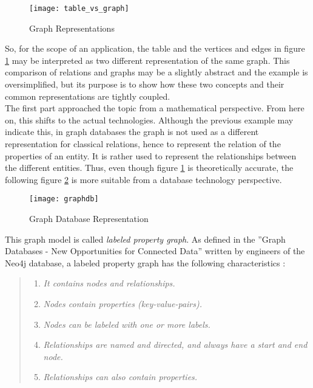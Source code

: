 \begin{figure}[H]
	\centering
	\texttt{[image: table\_vs\_graph]}
	\caption[Graph Representations]{Graph Representations }
	\label{fig:GraphTheoryExample}
\end{figure}

So, for the scope of an application, the table and the vertices and edges in figure \ref{fig:GraphTheoryExample} may be interpreted as two different representation of the same graph. This comparison of relations and graphs may be a slightly abstract and the example is oversimplified, but its purpose is to show how these two concepts and their common representations are tightly coupled.\\

The first part approached the topic from a mathematical perspective. From here on, this shifts to the actual technologies. Although the previous example may indicate this, in graph databases the graph is not used as a different representation for classical relations, hence to represent the relation of the properties of an entity. It is rather used to represent the relationships between the different entities. Thus, even though figure \ref{fig:GraphTheoryExample} is theoretically accurate, the following figure \ref{fig:GraphDBExample} is more suitable from a database technology perspective.

\begin{figure}[H]
	\centering
	\texttt{[image: graphdb]}
	\caption[Graph Database Representation]{Graph Database Representation }
	\label{fig:GraphDBExample}
\end{figure}

This graph model is called \emph{labeled property graph}. As defined in the ''Graph Databases - New Opportunities for Connected Data'' written by engineers of the Neo4j database, a labeled property graph has the following characteristics \cite{neo4j}:

\begin{quote}
	\begin{enumerate}
		\item\textit{It contains nodes and relationships. }
		\item\textit{Nodes contain properties (key-value-pairs). }
		\item\textit{Nodes can be labeled with one or more labels. }
		\item\textit{Relationships are named and directed, and always have a start and end node. }
		\item\textit{Relationships can also contain properties. }
	\end{enumerate}
\end{quote}

